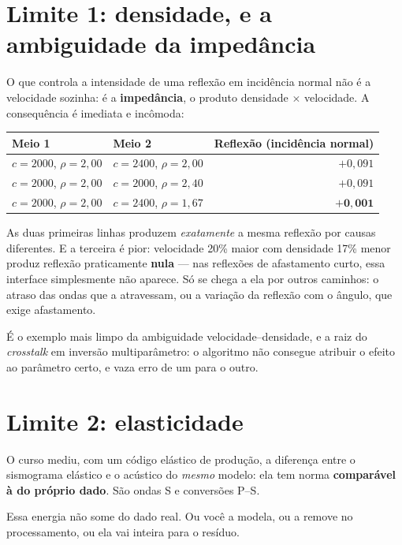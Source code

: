 \documentclass[11pt,a4paper,oneside]{report}
\begin{document}
\section{Limite 1: densidade, e a ambiguidade da imped\^ancia}

O que controla a intensidade de uma reflex\~ao em incid\^encia normal n\~ao
\'e a velocidade sozinha: \'e a \textbf{imped\^ancia}, o produto densidade
$\times$ velocidade. A consequ\^encia \'e imediata e inc\^omoda:

\begin{center}
\begin{tabular}{@{}llr@{}}
\toprule
\textbf{Meio 1} & \textbf{Meio 2} & \textbf{Reflex\~ao (incid\^encia normal)} \\
\midrule
$c=2000$, $\rho=2{,}00$ & $c=2400$, $\rho=2{,}00$ & $+0{,}091$ \\
$c=2000$, $\rho=2{,}00$ & $c=2000$, $\rho=2{,}40$ & $+0{,}091$ \\
$c=2000$, $\rho=2{,}00$ & $c=2400$, $\rho=1{,}67$ & $\mathbf{+0{,}001}$ \\
\bottomrule
\end{tabular}
\end{center}

As duas primeiras linhas produzem \emph{exatamente} a mesma reflex\~ao por
causas diferentes. E a terceira \'e pior: velocidade 20\% maior com densidade
17\% menor produz reflex\~ao praticamente \textbf{nula} --- nas reflex\~oes de
afastamento curto, essa interface simplesmente n\~ao aparece. S\'o se chega a
ela por outros caminhos: o atraso das ondas que a atravessam, ou a
varia\c{c}\~ao da reflex\~ao com o \^angulo, que exige afastamento.

\'E o exemplo mais limpo da ambiguidade velocidade--densidade, e a raiz do
\emph{crosstalk} em invers\~ao multipar\^ametro: o algoritmo n\~ao consegue
atribuir o efeito ao par\^ametro certo, e vaza erro de um para o outro.

\section{Limite 2: elasticidade}

O curso mediu, com um c\'odigo el\'astico de produ\c{c}\~ao, a diferen\c{c}a
entre o sismograma el\'astico e o ac\'ustico do \emph{mesmo} modelo: ela tem
norma \textbf{compar\'avel \`a do pr\'oprio dado}. S\~ao ondas S e
convers\~oes P--S.

Essa energia n\~ao some do dado real. Ou voc\^e a modela, ou a remove no
processamento, ou ela vai inteira para o res\'iduo.
\end{document}

